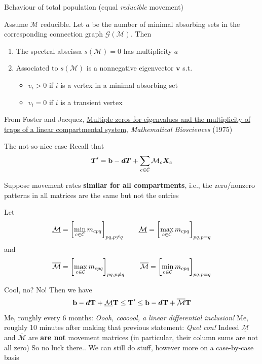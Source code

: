 \documentclass[aspectratio=169]{beamer}\usepackage[]{graphicx}\usepackage[]{xcolor}
\begin{document}
\begin{frame}{Behaviour of total population (equal \emph{reducible} movement)}
\begin{theorem}
Assume $\mathcal{M}$ reducible. Let $a$ be the number of minimal absorbing sets in the corresponding connection graph $\mathcal{G}(\mathcal{M})$. Then
\begin{enumerate}
	\item The spectral abscissa $s(\mathcal{M})=0$ has multiplicity $a$
	\item Associated to $s(\mathcal{M})$ is a nonnegative eigenvector $\mathbf{v}$ s.t.
	\begin{itemize}
		\item $v_i>0$ if $i$ is a vertex in a minimal absorbing set
		\item $v_i=0$ if $i$ is a transient vertex
	\end{itemize}
\end{enumerate}
\end{theorem}

\vfill
From Foster and Jacquez, \href{https://doi.org/10.1016/0025-5564(75)90096-6}{Multiple zeros for eigenvalues and the multiplicity of traps of a linear compartmental system}, \emph{Mathematical Biosciences} (1975) \nocite{foster1975multiple}
\end{frame}


\begin{frame}{The not-so-nice case}
Recall that
$$
\bm{T}'=\mathbf{b}-\bm{d}\bm{T}+\sum_{c\in\mathcal{C}}\mathcal{M}_c\bm{X}_{c}
$$

Suppose movement rates \textbf{similar for all compartments}, i.e., the zero/nonzero patterns in all matrices are the same but not the entries

Let
$$
\underline{\mathcal{M}}=\left[\min_{c\in\mathcal{C}}m_{cpq}\right]_{pq,p\neq q}\qquad 
\underline{\mathcal{M}}=\left[\max_{c\in\mathcal{C}}m_{cpq}\right]_{pq,p=q}
$$
and
$$
\overline{\mathcal{M}}=\left[\max_{c\in\mathcal{C}}m_{cpq}\right]_{pq,p\neq q}\qquad
\overline{\mathcal{M}}=\left[\min_{c\in\mathcal{C}}m_{cpq}\right]_{pq,p=q}
$$
\end{frame}


\begin{frame}{Cool, no? No!}
Then we have
$$
\mathbf{b}-\bm{d}\mathbf{T}+\underline{\mathcal{M}}\mathbf{T}\leq\mathbf{T}'\leq\mathbf{b}-\bm{d}\mathbf{T}+\overline{\mathcal{M}}\mathbf{T}
$$
\vfill
Me, roughly every 6 months: \emph{Oooh, coooool, a linear differential inclusion!}
\vfill
Me, roughly 10 minutes after making that previous statement: \emph{Quel con!} 
\vfill
Indeed $\underline{\mathcal{M}}$ and $\overline{\mathcal{M}}$ are \textbf{are not} movement matrices  (in particular, their column sums are not all zero)
\vfill
So no luck there.. 
\vfill
We can still do stuff, however more on a case-by-case basis
\end{frame}
\end{document}
